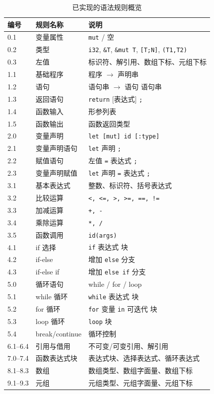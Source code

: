 \documentclass[12pt,a4paper]{ctexart}
\begin{document}
\begin{table}[H]
\centering
\caption{已实现的语法规则概览}
\begin{tabular}{lll}
\toprule
\textbf{编号} & \textbf{规则名称} & \textbf{说明} \\
\midrule
0.1 & 变量属性 & \texttt{mut} / 空 \\
0.2 & 类型 & \texttt{i32}, \texttt{\&T}, \texttt{\&mut T}, \texttt{[T;N]}, \texttt{(T1,T2)} \\
0.3 & 左值 & 标识符、解引用、数组下标、元组下标 \\
1.1 & 基础程序 & 程序 $\to$ 声明串 \\
1.2 & 语句 & 语句串 $\to$ 语句 语句串 \\
1.3 & 返回语句 & \texttt{return} [表达式] \texttt{;} \\
1.4 & 函数输入 & 形参列表 \\
1.5 & 函数输出 & 函数返回类型 \\
2.0 & 变量声明 & \texttt{let [mut] id [:type]} \\
2.1 & 变量声明语句 & \texttt{let} 声明 \texttt{;} \\
2.2 & 赋值语句 & 左值 \texttt{=} 表达式 \texttt{;} \\
2.3 & 变量声明赋值 & \texttt{let} 声明 \texttt{=} 表达式 \texttt{;} \\
3.1 & 基本表达式 & 整数、标识符、括号表达式 \\
3.2 & 比较运算 & \texttt{<, <=, >, >=, ==, !=} \\
3.3 & 加减运算 & \texttt{+, -} \\
3.4 & 乘除运算 & \texttt{*, /} \\
3.5 & 函数调用 & \texttt{id(args)} \\
4.1 & if 选择 & \texttt{if} 表达式 块 \\
4.2 & if-else & 增加 \texttt{else} 分支 \\
4.3 & if-else if & 增加 \texttt{else if} 分支 \\
5.0 & 循环语句 & while / for / loop \\
5.1 & while 循环 & \texttt{while} 表达式 块 \\
5.2 & for 循环 & \texttt{for} 变量 \texttt{in} 可迭代 块 \\
5.3 & loop 循环 & \texttt{loop} 块 \\
5.4 & break/continue & 循环控制 \\
\midrule
6.1--6.4 & 引用与借用 & 不可变/可变引用、解引用 \\
7.0--7.4 & 函数表达式块 & 表达式块、选择表达式、循环表达式 \\
8.1--8.3 & 数组 & 数组类型、数组字面量、数组下标 \\
9.1--9.3 & 元组 & 元组类型、元组字面量、元组下标 \\
\bottomrule
\end{tabular}
\end{table}
\end{document}
